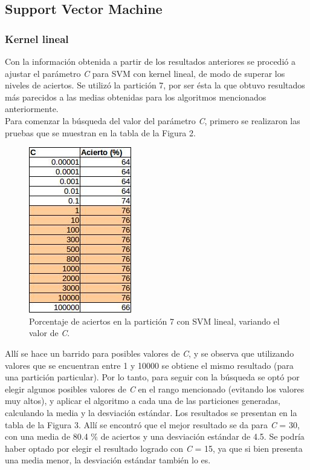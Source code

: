 \documentclass[12pt, a4paper]{article}
\begin{document}
\subsection*{Support Vector Machine}

\subsubsection*{Kernel lineal}

Con la información obtenida a partir de los resultados anteriores se procedió a ajustar el parámetro \textit{C} para SVM con kernel lineal, de modo de superar los niveles de aciertos. Se utilizó la partición 7, por ser ésta la que obtuvo resultados más parecidos a las medias obtenidas para los algoritmos mencionados anteriormente.\\
Para comenzar la búsqueda del valor del parámetro \textit{C}, primero se realizaron las pruebas que se muestran en la tabla de la Figura 2.

 \begin{figure}
    \centering
	\includegraphics[scale=0.8]{tabla2}
	\caption{Porcentaje de aciertos en la partición 7 con SVM lineal, variando el valor de \textit{C}.}
\end{figure}

Allí se hace un barrido para posibles valores de \textit{C}, y se observa que utilizando valores que se encuentran entre 1 y 10000 se obtiene el mismo resultado (para una partición particular). Por lo tanto, para seguir con la búsqueda se optó por elegir algunos posibles valores de \textit{C} en el rango mencionado (evitando los valores muy altos), y aplicar el algoritmo a cada una de las particiones generadas, calculando la media y la desviación estándar. Los resultados se presentan en la tabla de la Figura 3. Allí se encontró que el mejor resultado se da para \textit{C} = 30, con una media de 80.4 \% de aciertos y una desviación estándar de 4.5. Se podría haber optado por elegir el resultado logrado con \textit{C} = 15, ya que si bien presenta una media menor, la desviación estándar también lo es. 
\end{document}
